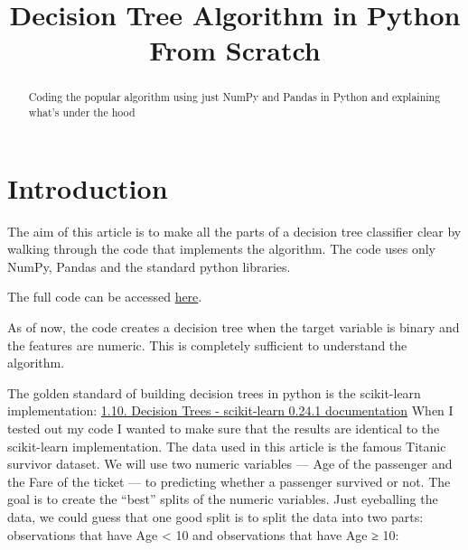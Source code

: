 \documentclass[]{article}
\title{Decision Tree Algorithm in Python From Scratch}
\author{}
\begin{document}
\maketitle

\begin{abstract}
Coding the popular algorithm using just NumPy and Pandas in Python and explaining what's under the hood

\end{abstract}

\section{Introduction}

The aim of this article is to make all the parts of a decision tree classifier clear by walking through the code that implements the algorithm. The code uses only NumPy, Pandas and the standard python libraries.

The full code can be accessed \href{https://github.com/Eligijus112/decision-tree-python}{here}.

As of now, the code creates a decision tree when the target variable is binary and the features are numeric. This is completely sufficient to understand the algorithm.

The golden standard of building decision trees in python is the scikit-learn implementation:
\href{https://scikit-learn.org/stable/modules/tree.html}{1.10. Decision Trees - scikit-learn 0.24.1 documentation}
When I tested out my code I wanted to make sure that the results are identical to the scikit-learn implementation.
The data used in this article is the famous Titanic survivor dataset. We will use two numeric variables — Age of the passenger and the Fare of the ticket — to predicting whether a passenger survived or not.
The goal is to create the “best” splits of the numeric variables. Just eyeballing the data, we could guess that one good split is to split the data into two parts: observations that have Age < 10 and observations that have Age ≥ 10:
\end{document}
